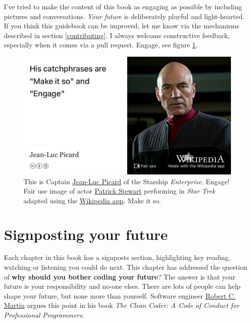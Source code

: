 \documentclass[
]{book}
\begin{document}
I've tried to make the content of this book as engaging as possible by including pictures and conversations. \emph{Your future} is deliberately playful and light-hearted. If you think this guidebook can be improved, let me know via the mechanisms described in section \ref{contributing}. I always welcome constructive feedback, especially when it comes via a pull request. Engage, see figure \ref{fig:startrek-fig}.

\begin{figure}

{\centering \includegraphics[width=1\linewidth]{images/captain-jean-luc-picard} 

}

\caption{This is Captain \href{https://en.wikipedia.org/wiki/Jean-Luc_Picard}{Jean-Luc Picard} of the Starship \emph{Enterprise}. Engage! Fair use image of actor \href{https://en.wikipedia.org/wiki/Patrick_Stewart}{Patrick Stewart} performing in \emph{Star Trek} adapted using the \href{https://apps.apple.com/us/app/wikipedia/id324715238}{Wikipedia app}. Make it so.}\label{fig:startrek-fig}
\end{figure}



\hypertarget{sign1}{%
\section{Signposting your future}\label{sign1}}

Each chapter in this book has a signposts section, highlighting key reading, watching or listening you could do next. This chapter has addressed the question of \textbf{why should you bother coding your future}? The answer is that your future is your responsibility and no-one elses. There are lots of people can help shape your future, but none more than yourself. Software engineer \href{https://en.wikipedia.org/wiki/Robert_C._Martin}{Robert C. Martin} argues this point in his book \emph{The Clean Coder: A Code of Conduct for Professional Programmers}. \citep{cleancoder}
\end{document}
